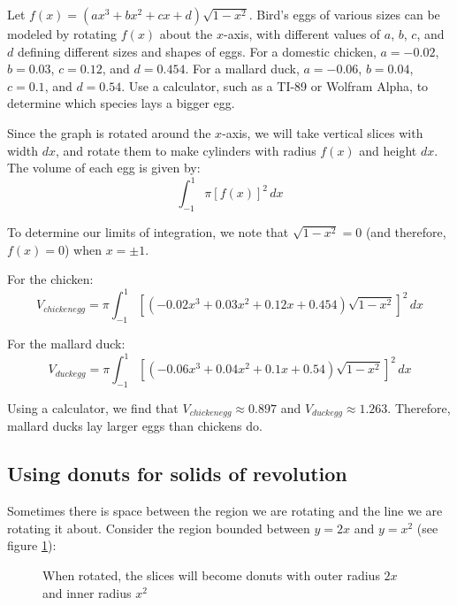 \begin{Exercise}[label = volume5]
Let $f(x) = (ax^3 + bx^2 + cx + d)\sqrt{1-x^2}$. Bird's eggs of various sizes 
can be modeled by rotating $f(x)$ about the $x$-axis, with different values of 
$a$, $b$, $c$, and $d$ defining different sizes and shapes of eggs. For a 
domestic chicken, $a = -0.02$, $b = 0.03$, $c = 0.12$, and $d = 0.454$. For a 
mallard duck, $a = -0.06$, $b = 0.04$, $c = 0.1$, and $d = 0.54$. Use a 
calculator, such as a TI-89 or Wolfram Alpha, to determine which species lays 
a bigger egg.  
\vspace{50mm}
\end{Exercise}

\begin{Answer}[ref = volume5]
Since the graph is rotated around the $x$-axis, we will take vertical slices 
with width $dx$, and rotate them to make cylinders with radius $f(x)$ and height
$dx$. The volume of each egg is given by:
$$\int_{-1}^1 \pi \left[ f(x) \right]^2\,dx$$

To determine our limits of integration, we note that $\sqrt{1 - x^2} = 0$ (and 
therefore, $f(x) = 0$) when $x = \pm 1$.

For the chicken: 
$$V_{chicken egg} = \pi \int_{-1}^1 \left[ \left(-0.02x^3 + 0.03x^2 + 0.12x + 
0.454 \right) \sqrt{1 - x^2} \right]^2\,dx$$

For the mallard duck:
$$V_{duck egg} = \pi \int_{-1}^1 \left[ \left( -0.06x^3 + 0.04x^2 + 0.1x + 
0.54 \right) \sqrt{1 - x^2} \right]^2\,dx$$

Using a calculator, we find that $V_{chicken egg} \approx 0.897$ and 
$V_{duck egg} \approx 1.263$. Therefore, mallard ducks lay larger eggs than 
chickens do. 
\end{Answer}

\subsection{Using donuts for solids of revolution}
Sometimes there is space between the region we are rotating and the line we are
rotating it about. Consider the region bounded between $y = 2x$ and $y = x^2$  
(see figure \ref{fig:donut}):

\begin{figure}[htbp]
    \centering
    \caption{When rotated, the slices will become donuts with outer radius $2x$
    and inner radius $x^2$}
    \label{fig:donut}
\end{figure}

